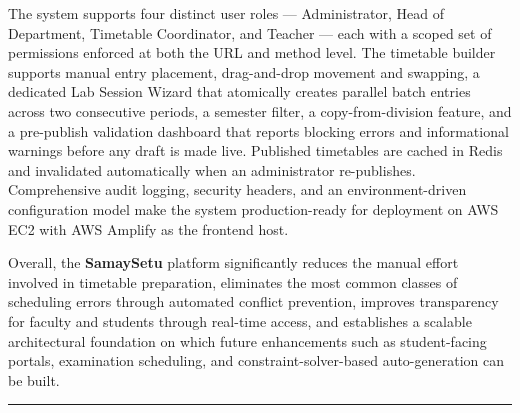 The system supports four distinct user roles --- Administrator, Head of Department, Timetable Coordinator, and Teacher --- each with a scoped set of permissions enforced at both the URL and method level. The timetable builder supports manual entry placement, drag-and-drop movement and swapping, a dedicated Lab Session Wizard that atomically creates parallel batch entries across two consecutive periods, a semester filter, a copy-from-division feature, and a pre-publish validation dashboard that reports blocking errors and informational warnings before any draft is made live. Published timetables are cached in Redis and invalidated automatically when an administrator re-publishes. Comprehensive audit logging, security headers, and an environment-driven configuration model make the system production-ready for deployment on AWS EC2 with AWS Amplify as the frontend host.

Overall, the \textbf{SamaySetu} platform significantly reduces the manual effort involved in timetable preparation, eliminates the most common classes of scheduling errors through automated conflict prevention, improves transparency for faculty and students through real-time access, and establishes a scalable architectural foundation on which future enhancements such as student-facing portals, examination scheduling, and constraint-solver-based auto-generation can be built.


\vspace{10mm}
\hrule
